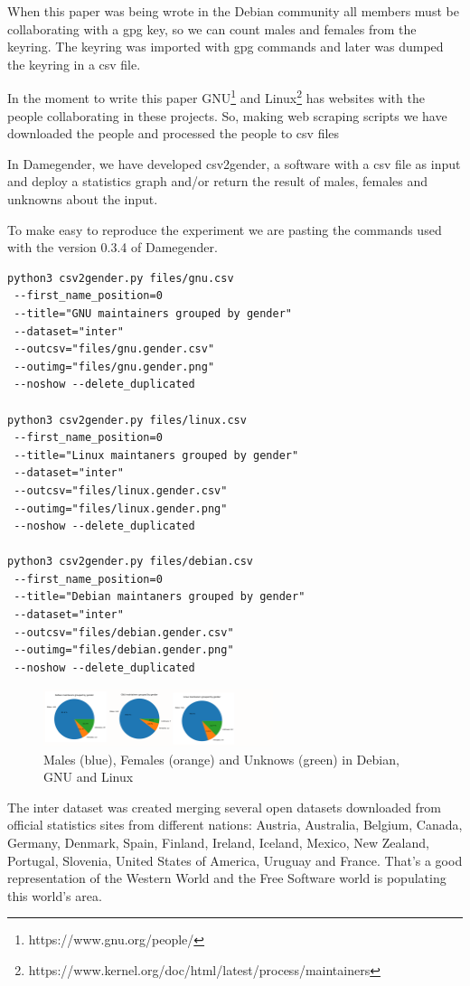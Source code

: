 \documentclass[a4paper]{article}
\begin{document}
When this paper was being wrote in the Debian community all members
must be collaborating with a gpg key, so we can count males and females
from the keyring. The keyring was imported with gpg commands and later
was dumped the keyring in a csv file.

In the moment to write this paper
GNU\footnote{https://www.gnu.org/people/} and
Linux\footnote{https://www.kernel.org/doc/html/latest/process/maintainers}
has websites with the people collaborating in these projects. So,
making web scraping scripts we have downloaded the people and processed
the people to csv files

In Damegender, we have developed csv2gender, a software with a csv
file as input and deploy a statistics graph and/or return the result
of males, females and unknowns about the input.

To make easy to reproduce the experiment we are pasting the commands
used with the version 0.3.4 of Damegender.

\begin{verbatim}
python3 csv2gender.py files/gnu.csv
 --first_name_position=0
 --title="GNU maintainers grouped by gender"
 --dataset="inter"
 --outcsv="files/gnu.gender.csv"
 --outimg="files/gnu.gender.png"
 --noshow --delete_duplicated

python3 csv2gender.py files/linux.csv
 --first_name_position=0
 --title="Linux maintaners grouped by gender"
 --dataset="inter"
 --outcsv="files/linux.gender.csv"
 --outimg="files/linux.gender.png"
 --noshow --delete_duplicated

python3 csv2gender.py files/debian.csv
 --first_name_position=0
 --title="Debian maintaners grouped by gender"
 --dataset="inter"
 --outcsv="files/debian.gender.csv"
 --outimg="files/debian.gender.png"
 --noshow --delete_duplicated
\end{verbatim}

\begin{figure}
  \centering
  \includegraphics[width=0.6\textwidth]{images/debian-gnu-linux.pdf}
  \caption[Caption for LOF]{Males (blue), Females (orange) and Unknows (green) in Debian, GNU and Linux}
\end{figure}

The inter dataset was created merging several open datasets downloaded
from official statistics sites from different nations: Austria,
Australia, Belgium, Canada, Germany, Denmark, Spain, Finland, Ireland,
Iceland, Mexico, New Zealand, Portugal, Slovenia, United States of
America, Uruguay and France. That's a good representation of the
Western World and the Free Software world is populating this world's
area\cite{gonzalez2008geographic}.
\end{document}
